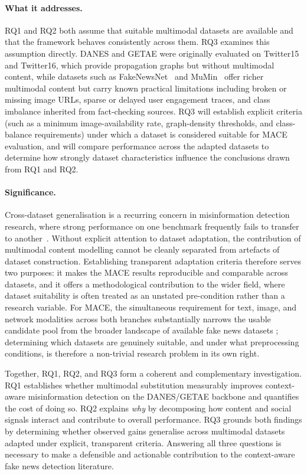 \paragraph{What it addresses.}
RQ1 and RQ2 both assume that suitable multimodal datasets are available
and that the framework behaves consistently across them. RQ3 examines
this assumption directly. DANES and GETAE were originally evaluated on
Twitter15 and Twitter16, which provide propagation graphs but without
multimodal content, while datasets such as
FakeNewsNet~\citep{shu2020fakenewsnet} and
MuMin~\citep{mumindataset} offer richer multimodal content but
carry known practical limitations including broken or missing image
URLs, sparse or delayed user engagement traces, and class imbalance
inherited from fact-checking sources. RQ3 will establish explicit
criteria (such as a minimum image-availability rate, graph-density
thresholds, and class-balance requirements) under which a dataset is
considered suitable for MACE evaluation, and will compare performance
across the adapted datasets to determine how strongly dataset
characteristics influence the conclusions drawn from RQ1 and RQ2.

\paragraph{Significance.}
Cross-dataset generalisation is a recurring concern in misinformation
detection research, where strong performance on one benchmark frequently
fails to transfer to another~\citep{mumindataset}. Without explicit
attention to dataset adaptation, the contribution of multimodal content
modelling cannot be cleanly separated from artefacts of dataset
construction. Establishing transparent adaptation criteria therefore
serves two purposes: it makes the MACE results reproducible and
comparable across datasets, and it offers a methodological contribution
to the wider field, where dataset suitability is often treated as an
unstated pre-condition rather than a research variable. For MACE, the simultaneous requirement for text, image, and network modalities across both branches substantially narrows the usable candidate pool from the broader landscape of available fake news datasets \citep{lv2025multimodal}; determining which datasets are genuinely suitable, and under what preprocessing conditions, is therefore a non-trivial research problem in its own right.

Together, RQ1, RQ2, and RQ3 form a coherent and complementary
investigation. RQ1 establishes whether multimodal substitution
measurably improves context-aware misinformation detection on the
DANES/GETAE backbone and quantifies the cost of doing so. RQ2 explains
\emph{why} by decomposing how content and social signals interact and
contribute to overall performance. RQ3 grounds both findings by
determining whether observed gains generalise across multimodal
datasets adapted under explicit, transparent criteria. Answering all
three questions is necessary to make a defensible and actionable
contribution to the context-aware fake news detection literature.
